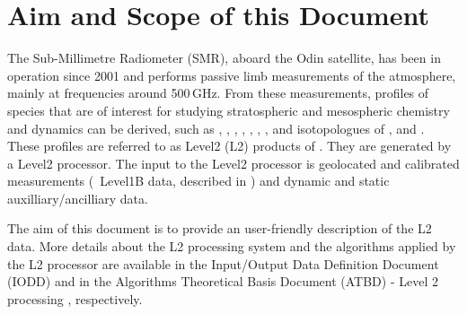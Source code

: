 \chapter{Aim and Scope of this Document}
\label{chapter:intro}

\setcounter{page}{1}

The Sub-Millimetre Radiometer (SMR), aboard the Odin satellite, has been in operation since 2001 and performs passive limb measurements of the atmosphere, mainly at frequencies around 500\,GHz. From these measurements, profiles of species that are of interest for studying stratospheric and mesospheric chemistry and dynamics can be derived, such as , , , , , , , and isotopologues of , and . These profiles are referred to as Level2 (L2) products of \smr. They are generated by a Level2 processor. The input to the Level2 processor is geolocated and calibrated measurements (\smr\ Level1B data, described in \citet{atbdl1b}) and dynamic and static auxilliary/ancilliary data.

The aim of this document is to provide an user-friendly description of the L2 data. More details about the L2 processing system and the algorithms applied by the L2 processor are available in the Input/Output Data Definition Document (IODD) \citep{iodd} and in the Algorithms Theoretical Basis Document (ATBD) - Level 2 processing \citep{atbdl2}, respectively. 
  
